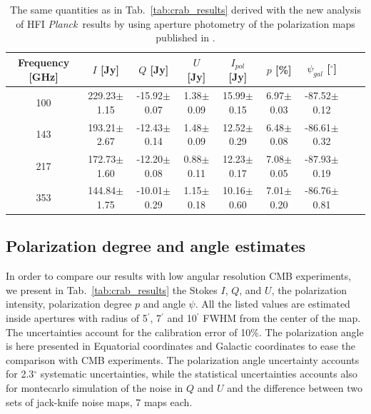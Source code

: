 \documentclass[twocolumn,traditabstract]{aa}
\def\Planck{\textit{Planck}}
\begin{document}
 \begin{table}[h!]
  \centering
      \begin{tabular}{ccccccccc}
      \hline
      \hline
       Frequency [GHz] & \small $I$ [Jy] & \small $Q$ [Jy] & \small $U$ [Jy] & \small $I_{pol}$ [Jy] & \small $p$ [\%] & \small $\psi_{gal}$ [$^\circ$] \\
      \hline

\small 100 & \small 229.23$\pm$1.15  & \small -15.92$\pm$0.07 & \small 1.38$\pm$0.09 & \small 15.99$\pm$0.15 & \small 6.97$\pm$0.03 & \small -87.52$\pm$0.12  \\ 
\small 143 & \small 193.21$\pm$2.67  & \small -12.43$\pm$0.14 & \small 1.48$\pm$0.09 & \small 12.52$\pm$0.29 & \small 6.48$\pm$0.08 & \small -86.61$\pm$0.32  \\
\small 217 & \small 172.73$\pm$1.60  & \small -12.20$\pm$0.08 & \small 0.88$\pm$0.11 & \small 12.23$\pm$0.17 & \small 
7.08$\pm$0.05 & \small -87.93$\pm$0.19  \\
\small 353 & \small 144.84$\pm$1.75  & \small -10.01$\pm$0.29 & \small 1.15$\pm$0.18 & \small 10.16$\pm$0.60 & \small 7.01$\pm$0.20 & \small -86.76$\pm$0.81 \\
    \hline            
    \hline   
    \end{tabular}
   \caption{The same quantities as in Tab.~\ref{tab:crab_results} derived with the new analysis of HFI \Planck\ results by using aperture photometry of the polarization maps published in \cite{refId0}.}
    \label{tab:planck_results}
 \end{table}

\subsection{Polarization degree and angle estimates}
In order to compare our results with low angular resolution CMB experiments, we present in Tab.~\ref{tab:crab_results} the Stokes $I$, $Q$, and $U$, the polarization intensity, polarization degree $p$ and angle $\psi$. All the listed values are estimated inside apertures with radius of 5$^\prime$, 7$^\prime$ and 10$^\prime$ FWHM from the center of the map. The uncertainties account for the calibration error of 10\%. 
The polarization angle is here presented in Equatorial coordinates and Galactic coordinates to ease the comparison with CMB experiments.
The polarization angle uncertainty accounts for 2.3$^{\circ}$ systematic uncertainties, while the statistical uncertainties accounts also for montecarlo simulation of the noise in $Q$ and $U$ and the difference between two sets of jack-knife noise maps, 7 maps each.
\end{document}
